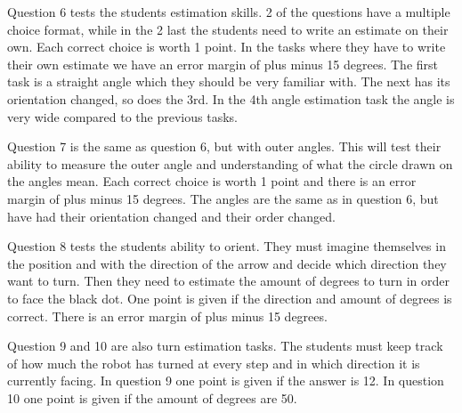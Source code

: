 \bigskip\noindent
Question 6 tests the students estimation skills. 2 of the questions have a multiple choice format, while in the 2 last the students need to write an estimate on their own. Each correct choice is worth 1 point. In the tasks where they have to write their own estimate we have an error margin of plus minus 15 degrees. The first task is a straight angle which they should be very familiar with. The next has its orientation changed, so does the 3rd. In the 4th angle estimation task the angle is very wide compared to the previous tasks. 

\bigskip\noindent
Question 7 is the same as question 6, but with outer angles. This will test their ability to measure the outer angle and understanding of what the circle drawn on the angles mean. Each correct choice is worth 1 point and there is an error margin of plus minus 15 degrees. The angles are the same as in question 6, but have had their orientation changed and their order changed. 

\bigskip\noindent
Question 8 tests the students ability to orient. They must imagine themselves in the position and with the direction of the arrow and decide which direction they want to turn. Then they need to estimate the amount of degrees to turn in order to face the black dot. One point is given if the direction and amount of degrees is correct. There is an error margin of plus minus 15 degrees. 

\bigskip\noindent
Question 9 and 10 are also turn estimation tasks. The students must keep track of how much the robot has turned at every step and in which direction it is currently facing. In question 9 one point is given if the answer is 12. In question 10 one point is given if the amount of degrees are 50. 